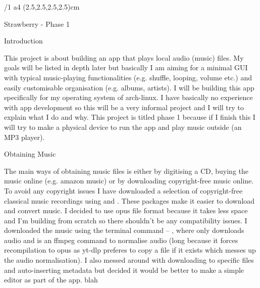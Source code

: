 \message{\optexversion}

\typosize[11/13]
\margins/1 a4 (2.5,2.5,2.5,2.5)cm


\fontText

\tit Strawberry - Phase 1

\chap Introduction

This project is about building an app that plays local audio (music) files. My goals will be listed in depth later but basically I am aiming for a minimal GUI with typical music-playing functionalities (e.g. shuffle, looping, volume etc.) and easily customisable organisation (e.g. albums, artists). I will be building this app specifically for my operating system of arch-linux. I have basically no experience with app development so this will be a very informal project and I will try to explain what I do and why. This project is titled phase 1 because if I finish this I will try to make a physical device to run the app and play music outside (an MP3 player). 

\sec Obtaining Music

The main ways of obtaining music files is either by digitising a CD, buying the music online (e.g. amazon music) or by downloading copyright-free music online. To avoid any copyright issues I have downloaded a selection of copyright-free classical music recordings using  and . These packages make it easier to download and convert music. I decided to use opus file format because it takes less space and I'm building from scratch so there shouldn't be any compatibility issues. I downloaded the music using the terminal command -- , where  only downloads audio and  is an ffmpeg command to normalise audio (long because it forces recompilation to opus as yt-dlp preferes to copy a file if it exists which messes up the audio normalisation). I also messed around with downloading to specific files and auto-inserting metadata but decided it would be better to make a simple editor as part of the app. blah

\bye
